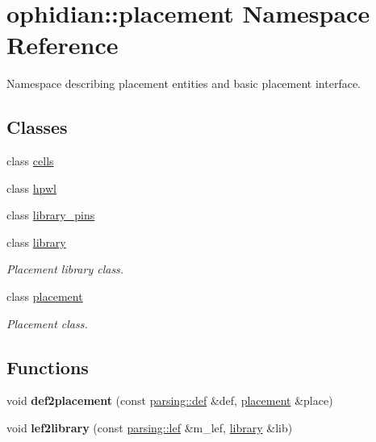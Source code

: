 \hypertarget{namespaceophidian_1_1placement}{\section{ophidian\-:\-:placement Namespace Reference}
\label{namespaceophidian_1_1placement}
}


Namespace describing placement entities and basic placement interface.  


\subsection*{Classes}
\begin{DoxyCompactItemize}
\item 
class \hyperlink{classophidian_1_1placement_1_1cells}{cells}
\item 
class \hyperlink{classophidian_1_1placement_1_1hpwl}{hpwl}
\item 
class \hyperlink{classophidian_1_1placement_1_1library__pins}{library\-\_\-pins}
\item 
class \hyperlink{classophidian_1_1placement_1_1library}{library}
\begin{DoxyCompactList}\small\item\em Placement library class. \end{DoxyCompactList}\item 
class \hyperlink{classophidian_1_1placement_1_1placement}{placement}
\begin{DoxyCompactList}\small\item\em Placement class. \end{DoxyCompactList}\end{DoxyCompactItemize}
\subsection*{Functions}
\begin{DoxyCompactItemize}
\item 
\hypertarget{namespaceophidian_1_1placement_a19e179515c9732f28a77b83180b98cc6}{void {\bfseries def2placement} (const \hyperlink{classophidian_1_1parsing_1_1def}{parsing\-::def} \&def, \hyperlink{classophidian_1_1placement_1_1placement}{placement} \&place)}\label{namespaceophidian_1_1placement_a19e179515c9732f28a77b83180b98cc6}

\item 
\hypertarget{namespaceophidian_1_1placement_af22e18a19f343a6509b38853e9351588}{void {\bfseries lef2library} (const \hyperlink{classophidian_1_1parsing_1_1lef}{parsing\-::lef} \&m\-\_\-lef, \hyperlink{classophidian_1_1placement_1_1library}{library} \&lib)}\label{namespaceophidian_1_1placement_af22e18a19f343a6509b38853e9351588}

\end{DoxyCompactItemize}
